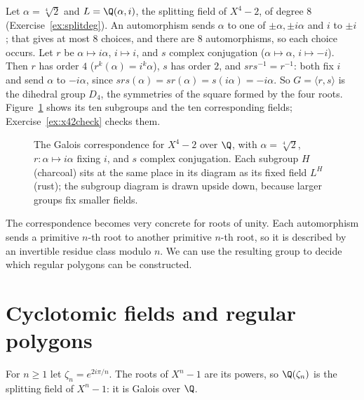 \begin{example}\label{ex:galx42}
Let $\alpha=\sqrt[4]2$ and $L=\Q(\alpha,i)$, the splitting field of $X^4-2$, of degree $8$ (Exercise~\ref{ex:splitdeg}). An automorphism sends $\alpha$ to one of $\pm\alpha,\pm i\alpha$ and $i$ to $\pm i$; that gives at most $8$ choices, and there are $8$ automorphisms, so each choice occurs. Let $r$ be $\alpha\mapsto i\alpha$, $i\mapsto i$, and $s$ complex conjugation ($\alpha\mapsto\alpha$, $i\mapsto-i$). Then $r$ has order $4$ ($r^k(\alpha)=i^k\alpha$), $s$ has order $2$, and $srs^{-1}=r^{-1}$: both fix $i$ and send $\alpha$ to $-i\alpha$, since $srs(\alpha)=sr(\alpha)=s(i\alpha)=-i\alpha$. So $G=\langle r,s\rangle$ is the dihedral group $D_4$, the symmetries of the square formed by the four roots. Figure~\ref{fig:galoislattice} shows its ten subgroups and the ten corresponding fields; Exercise~\ref{ex:x42check} checks them.
\end{example}

\begin{figure}[ht]
\centering
{}
\caption{The Galois correspondence for $X^4-2$ over $\Q$, with $\alpha=\sqrt[4]2$, $r:\alpha\mapsto i\alpha$ fixing $i$, and $s$ complex conjugation. Each subgroup $H$ (charcoal) sits at the same place in its diagram as its fixed field $L^H$ (rust); the subgroup diagram is drawn upside down, because larger groups fix smaller fields.}
\label{fig:galoislattice}
\end{figure}

The correspondence becomes very concrete for roots of unity. Each automorphism sends a primitive $n$-th root to another primitive $n$-th root, so it is described by an invertible residue class modulo $n$. We can use the resulting group to decide which regular polygons can be constructed.

\section{Cyclotomic fields and regular polygons}

For $n\ge1$ let $\zeta_n=e^{2i\pi/n}$. The roots of $X^n-1$ are its powers, so $\Q(\zeta_n)$ is the splitting field of $X^n-1$: it is Galois over $\Q$.

